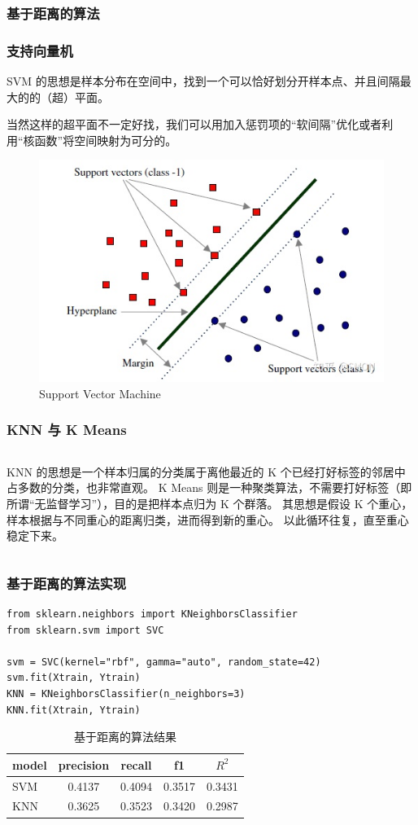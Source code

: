 \subsubsection{基于距离的算法}
\begin{frame}
    \frametitle{支持向量机}
    SVM 的思想是样本分布在空间中，找到一个可以恰好划分开样本点、并且间隔最大的的（超）平面。

    当然这样的超平面不一定好找，我们可以用加入惩罚项的“软间隔”优化或者利用“核函数”将空间映射为可分的。

    \begin{center}
        \begin{figure}
            \includegraphics[width=0.6\linewidth]{../lib/SVM.jpeg}
            \caption{Support Vector Machine}
            \label{SVM}
        \end{figure}
    \end{center}
\end{frame}
\begin{frame}
    \frametitle{KNN 与 K Means}
    \begin{columns}
        KNN 的思想是一个样本归属的分类属于离他最近的 K 个已经打好标签的邻居中占多数的分类，也非常直观。
        K Means 则是一种聚类算法，不需要打好标签（即所谓“无监督学习”），目的是把样本点归为 K 个群落。
        其思想是假设 K 个重心，样本根据与不同重心的距离归类，进而得到新的重心。
        以此循环往复，直至重心稳定下来。
    \end{columns}
\end{frame}
\begin{frame}[fragile]
    \frametitle{基于距离的算法实现}
    \begin{verbatim}
from sklearn.neighbors import KNeighborsClassifier
from sklearn.svm import SVC

svm = SVC(kernel="rbf", gamma="auto", random_state=42)
svm.fit(Xtrain, Ytrain)
KNN = KNeighborsClassifier(n_neighbors=3)
KNN.fit(Xtrain, Ytrain)
    \end{verbatim}
    \begin{table}
        \caption{基于距离的算法结果}
        \begin{tabular}{l|cccc}
            model & precision & recall & f1     & \(R^2\) \\ \hline
            SVM   & 0.4137    & 0.4094 & 0.3517 & 0.3431  \\
            KNN   & 0.3625    & 0.3523 & 0.3420 & 0.2987  \\
        \end{tabular}
        \label{distances}
    \end{table}
\end{frame}
